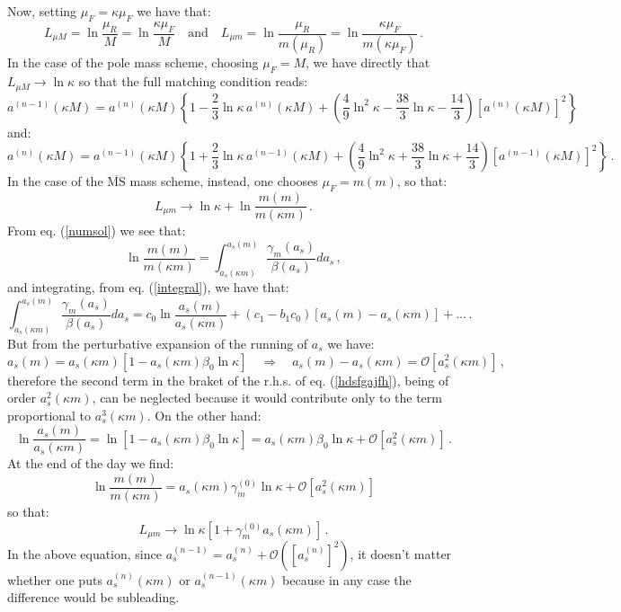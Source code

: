 \documentclass[10pt,a4paper]{article}
\begin{document}
Now, setting $\mu_F=\kappa \mu_F$ we have that:
$$
L_{\mu M} = \ln\frac{\mu_R}{M}=\ln\frac{\kappa\mu_F}{M}\quad\mbox{and}\quad L_{\mu m} = \ln\frac{\mu_R}{m(\mu_R)}=\ln\frac{\kappa\mu_F}{m(\kappa \mu_F)}\,.
$$
In the case of the pole mass scheme, choosing $\mu_F = M$, we have directly that $L_{\mu M}\rightarrow \ln\kappa$ so that the full matching condition reads:
\begin{equation}
a^{(n-1)}(\kappa M)=a^{(n)}(\kappa M)\left\{1-\frac23\ln\kappa\,a^{(n)}(\kappa M)+\left(\frac49\ln^2\kappa-\frac{38}3\ln\kappa-\frac{14}3\right)[a^{(n)}(\kappa M)]^2\right\}
\end{equation}
and:
\begin{equation}
a^{(n)}(\kappa M)=a^{(n-1)}(\kappa M)\left\{1+\frac23\ln\kappa\,a^{(n-1)}(\kappa M)+\left(\frac49\ln^2\kappa+\frac{38}3\ln\kappa+\frac{14}3\right)[a^{(n-1)}(\kappa M)]^2\right\}\,.
\end{equation}
In the case of the $\overline{\mbox{MS}}$ mass scheme, instead, one chooses $\mu_F = m(m)$, so that:
\begin{equation}
L_{\mu m} \rightarrow \ln\kappa + \ln\frac{m(m)}{m(\kappa m)}\,.
\end{equation}
From eq. (\ref{numsol}) we see that:
\begin{equation}\label{chezebedei}
\ln\frac{m(m)}{m(\kappa m)}=\int_{a_s(\kappa m)}^{a_s(m)}\frac{\gamma_m(a_s)}{\beta(a_s)}da_s\,,
\end{equation}
and integrating, from eq. (\ref{integral}), we have that:
\begin{equation}\label{hdsfgajfh}
\int_{a_s(\kappa m)}^{a_s(m)}\frac{\gamma_m(a_s)}{\beta(a_s)}da_s = c_0\ln\frac{a_s(m)}{a_s(\kappa m)} + (c_1-b_1c_0)[a_s(m)-a_s(\kappa m)]+\dots\,.
\end{equation}
But from the perturbative expansion of the running of $a_s$ we have:
\begin{equation}
a_s(m) = a_s(\kappa m)\left[1-a_s(\kappa m)\beta_0\ln\kappa\right]\quad\Rightarrow\quad a_s(m)-a_s(\kappa m) = \mathcal{O}[a_s^2(\kappa m)]\,,
\end{equation}
therefore the second term in the braket of the r.h.s. of eq. (\ref{hdsfgajfh}), being of order $a_s^2(\kappa m)$, can be neglected because it would contribute only to the term proportional to $a_s^3(\kappa m)$. On the other hand: 
\begin{equation}
\ln\frac{a_s(m)}{a_s(\kappa m)} = \ln\left[1-a_s(\kappa m)\beta_0\ln\kappa \right]=a_s(\kappa m)\beta_0\ln\kappa+\mathcal{O}[a_s^2(\kappa m)]\,.
\end{equation}
At the end of the day we find:
\begin{equation}
\ln\frac{m(m)}{m(\kappa m)}=a_s(\kappa m)\gamma_m^{(0)}\ln\kappa+\mathcal{O}[a_s^2(\kappa m)]
\end{equation}
so that:
\begin{equation}\label{bugni}
L_{\mu m} \rightarrow \ln\kappa[1+\gamma_m^{(0)}a_s(\kappa m)]\,.
\end{equation}
In the above equation, since $a_s^{(n-1)}=a_s^{(n)}+\mathcal{O}([a_s^{(n)}]^2)$, it doesn't matter whether one puts $a_s^{(n)}(\kappa m)$ or $a_s^{(n-1)}(\kappa m)$ because in any case the difference would be subleading.
\end{document}
